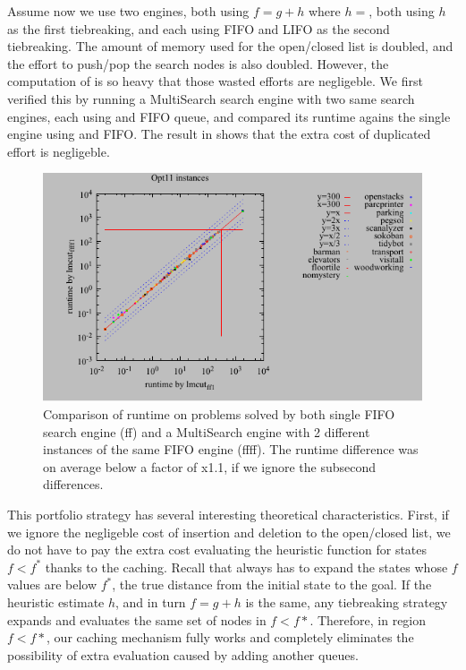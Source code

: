 Assume now we use two \astar engines, both using $f=g+h$ where $h=$\lmcut, both using $h$ as the first tiebreaking, and each using FIFO and LIFO as the second tiebreaking.
The amount of memory used for the open/closed list is doubled, and the effort to push/pop the search nodes is also doubled.
However, the computation of \lmcut is so heavy that those wasted efforts are negligeble.
We first verified this by running a MultiSearch search engine with two same search engines, each using \lmcut and FIFO queue, and compared its runtime agains the single engine using \lmcut and FIFO. The result in  shows that the extra cost of duplicated effort is negligeble.

\begin{figure}[htbp]
 \centering
 \includegraphics{tables/opt11-time-lmcut_ff-lmcut_ffff.pdf}
 \caption{Comparison of runtime on problems solved by both single FIFO search engine (ff) and a MultiSearch engine with 2 different instances of the same FIFO engine (ffff). The runtime difference was on average below a factor of x1.1, if we ignore the subsecond differences.}
 \label{ffff}
\end{figure}

This portfolio strategy has several interesting theoretical characteristics. First, if we ignore the negligeble cost of insertion and deletion to the open/closed list, we do not have to pay the extra cost evaluating the heuristic function for states $f<f^*$ thanks to the caching.
Recall that \astar always has to expand the states whose $f$ values are below $f^*$, the true distance from the initial state to the goal. If the heuristic estimate $h$, and in turn $f=g+h$ is the same, any tiebreaking strategy expands and evaluates the same set of nodes in $f<f*$.
Therefore, in region $f<f*$, our caching mechanism fully works and completely eliminates the possibility of extra evaluation caused by adding another queues.

